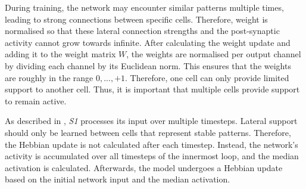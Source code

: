 During training, the network  may encounter similar patterns multiple times, leading to strong connections between specific cells. Therefore, weight is normalised so that these lateral connection strengths and the post-synaptic activity cannot grow towards infinite. After calculating the weight update and adding it to the weight matrix $W$, the weights are normalised per output channel by dividing each channel by its Euclidean norm. This ensures that the weights are roughly in the range $0, ..., +1$.
Therefore, one cell can only provide limited support to another cell.
Thus, it is important that multiple cells provide support to remain active.

As described in , \emph{S1} processes its input over multiple timesteps. Lateral support should only be learned between cells that represent stable patterns.
Therefore, the Hebbian update is not calculated after each timestep.
Instead, the network's activity is accumulated over all timesteps of the innermost loop, and the median activation is calculated.
Afterwards, the model undergoes a Hebbian update based on the initial network input and the median activation.





